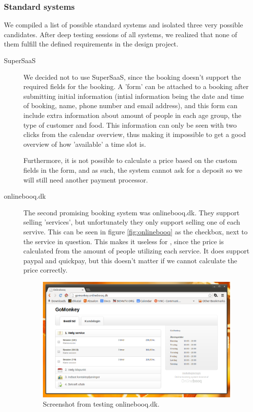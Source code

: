 \subsubsection{Standard systems}

We compiled a list of possible standard systems and isolated three very possible
candidates. After deep testing sessions of all systems, we realized that none
of them fulfill the defined requirements in the design project.

\begin{description}
\item[SuperSaaS]
We decided not to use SuperSaaS, since the booking doesn’t support the required 
fields for the booking. A 'form' can be attached to a booking after submitting 
initial information (intial information being the date and time of booking, 
name, phone number and email address), and this 
form can include extra information about amount of people in each age group, the
type of customer and food. This information can only be seen with two clicks 
from the calendar overview, thus making it impossible to get a good overview of 
how 'available' a time slot is.

Furthermore, it is not possible to calculate a price based on the custom fields 
in the form, and as such, the system cannot ask for a deposit so we will still 
need another payment processor.

\item[onlinebooq.dk]
The second promising booking system was onlinebooq.dk. They support selling 
'services', but unfortunately they only support selling one of each servive.
This can be seen in figure \autoref{fig:onlinebooq} as the checkbox, next to the 
service in question. This makes it useless for \gomonkey, since the price is 
calculated from the amount of people utilizing each service. It does support 
paypal and quickpay, but this doesn't matter if we cannot calculate the price 
correctly.

\begin{figure}[htbp]
    \centering
        \includegraphics[width=.8\textwidth]{figures/onlinebooq.png}
	    \caption{Screenshot from testing onlinebooq.dk.}
        \label{fig:onlinebooq}
\end{figure}
		


\end{description}
